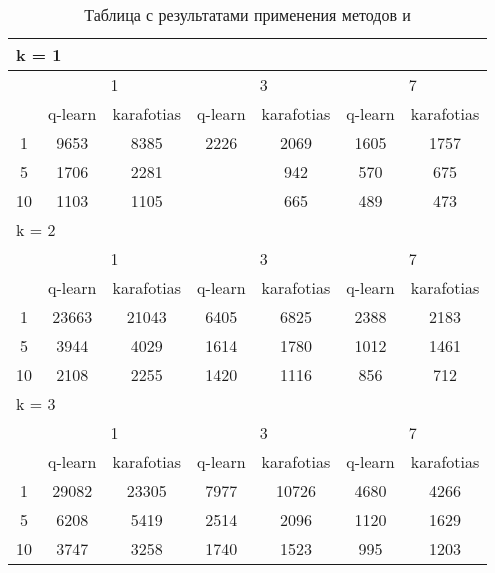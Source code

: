 \begin{table}
\centering
  \begin{tabular}{|*7{c|}}
    \hline
    \multicolumn{7}{|l|}{k = 1} \\
    \hline
    \multirow{2}{*}{\diagbox{$\mu$}{$\lambda$}} & \multicolumn{2}{c|}{1} & \multicolumn{2}{c|}{3} & \multicolumn{2}{c|}{7} \\
    \cline{2-7}
    & q-learn & karafotias & q-learn & karafotias & q-learn & karafotias \\
    \hline
    1 & 9653 & 8385 & 2226& 2069& 1605 & 1757 \\
    \hline
    5 & 1706 & 2281& \cellcolor{olive}{894} & 942 & 570 & 675 \\
    \hline
    10 & 1103 & 1105& \cellcolor{olive}{604} & 665 & 489 & 473 \\
    \hline
    \multicolumn{7}{|l|}{k = 2} \\
    \hline
    \multirow{2}{*}{\diagbox{$\mu$}{$\lambda$}} & \multicolumn{2}{c|}{1} & \multicolumn{2}{c|}{3} & \multicolumn{2}{c|}{7} \\
    \cline{2-7}
    & q-learn & karafotias & q-learn & karafotias & q-learn & karafotias \\
    \hline
    1 & 23663 & 21043 & 6405 & 6825 & 2388 & 2183 \\
    \hline
    5 & 3944 & 4029 & 1614 & 1780 & 1012 & 1461 \\
    \hline
    10 & 2108 & 2255 & 1420 & 1116 & 856 & 712 \\
    \hline
    \multicolumn{7}{|l|}{k = 3} \\
    \hline
    \multirow{2}{*}{\diagbox{$\mu$}{$\lambda$}} & \multicolumn{2}{c|}{1} & \multicolumn{2}{c|}{3} & \multicolumn{2}{c|}{7} \\
    \cline{2-7}
    & q-learn & karafotias & q-learn & karafotias & q-learn & karafotias \\
    \hline
    1 & 29082 & 23305 & 7977 & 10726 & 4680 & 4266 \\
    \hline
    5 & 6208 & 5419 & 2514 & 2096 & 1120 & 1629 \\
    \hline
    10 & 3747 & 3258 & 1740 & 1523 & 995 & 1203 \\
    \hline
  \end{tabular}
  \captionsetup{justification=centering}
  \caption{Таблица с результатами применения методов  и }
\end{table}

